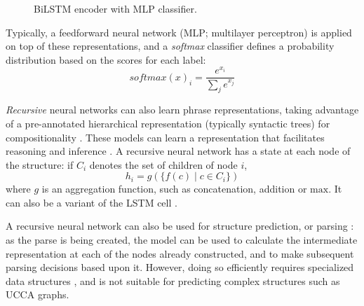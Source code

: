 \documentclass[12pt,a4paper,table]{report}
\renewcommand\cite{\citep}      %
\begin{document}
\begin{figure}\centering
{}
\caption{BiLSTM encoder with MLP classifier.}\label{fig:bilstm}
\end{figure}

Typically, a feedforward neural network (MLP; multilayer perceptron) is applied on top
of these representations, and a \textit{softmax} classifier defines a probability
distribution based on the scores for each label:
\[softmax(x)_i = \frac{e^{x_i}}{\sum_je^{x_j}}\]

\textit{Recursive} neural networks can also learn phrase representations, taking advantage
of a pre-annotated hierarchical representation (typically syntactic trees) for
compositionality \cite{socher2010learning}.
These models can learn a representation that facilitates reasoning and inference \cite{bowman2014recursive}.
A recursive neural network has a state at each node of the structure: if $C_i$ denotes the set of children of
node $i$,
\[
  h_i=g(\{f(c)\;|\;c\in C_i\})
\]
where $g$ is an aggregation function, such as concatenation, addition or $\mathrm{max}$.
It can also be a variant of the LSTM cell \cite{tai-etal-2015-improved}.

A recursive neural network can also be used for structure prediction, or parsing
\cite{socher2013recursive,dyer2015transition}: as the parse is being created, the model can
be used to calculate the intermediate representation at each of the nodes already constructed,
and to make subsequent parsing decisions based upon it.
However, doing so efficiently requires specialized data structures \cite{bowman2016fast},
and is not suitable for predicting complex structures such as UCCA graphs.
\end{document}
